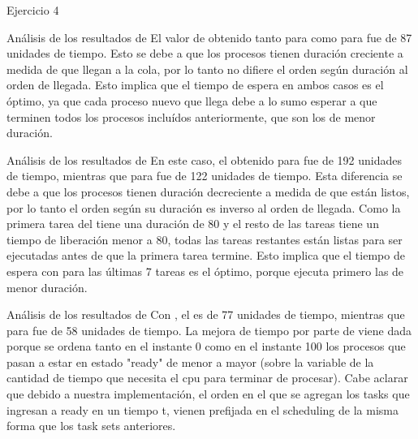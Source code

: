 \begin{section}{Ejercicio 4}
\begin{subsection}{Análisis de los resultados de }
	El valor de  obtenido tanto para  como para  fue de 87 unidades de tiempo. Esto se debe a que los procesos tienen duración creciente a medida de que llegan a la cola, por lo tanto no difiere el orden según duración al orden de llegada. Esto implica que el tiempo de espera en ambos casos es el óptimo, ya que cada proceso nuevo que llega debe a lo sumo esperar a que terminen todos los procesos incluídos anteriormente, que son los de menor duración.
\end{subsection}

\begin{subsection}{Análisis de los resultados de }
	En este caso, el  obtenido para  fue de 192 unidades de tiempo, mientras que para  fue de 122 unidades de tiempo. Esta diferencia se debe a que los procesos tienen duración decreciente a medida de que están listos, por lo tanto el orden según su duración es inverso al orden de llegada. Como la primera tarea del  tiene una duración de 80 y el resto de las tareas tiene un tiempo de liberación menor a 80, todas las tareas restantes están listas para ser ejecutadas antes de que la primera tarea termine. Esto implica que el tiempo de espera con  para las últimas 7 tareas es el óptimo, porque ejecuta primero las de menor duración.
\end{subsection}

\begin{subsection}{Análisis de los resultados de }
	Con , el  es de 77 unidades de tiempo, mientras que para  fue de 58 unidades de tiempo. La mejora de tiempo por parte de  viene dada porque se ordena tanto en el instante 0 como en el instante 100 los procesos que pasan a estar en estado "ready" de menor a mayor (sobre la variable de la cantidad de tiempo que necesita el cpu para terminar de procesar). Cabe aclarar que debido a nuestra implementación, el orden en el que se agregan los tasks que ingresan a ready en un tiempo t, vienen prefijada en el scheduling  de la misma forma que los task sets anteriores.
\end{subsection}


\end{section}
